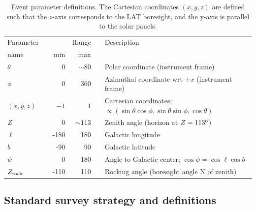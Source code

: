 \documentclass[aps,twocolumn,prd,superscriptaddress,showpacs,nofootinbib,fixfloat]{revtex4}
\newcommand{\degree}{^{\rm o}}
\newcommand{\zrock}{$Z_{\rm rock}$}
\begin{document}
\begin{table}
  \begin{center}
    \begin{tabular}{lcrrcl}
      \hline
      Parameter &\hphantom{i}& & Range &\hphantom{i}&  Description\\
      name      && min & max &&            \\
      \hline
      $\theta$ &&    0 &  $\sim80$ && Polar coordinate (instrument frame) \\
      $\phi$   &&    0 &       360 && Azimuthal coordinate wrt $+x$ (instrument frame) \\
      $(x,y,z)$&&  $-1$& $1$ && Cartesian coordinates;
      $\propto(\sin\theta\cos\phi, \sin\theta\sin\phi, \cos\theta)$\\
      $Z$      &&    0 & $\sim113$ && Zenith angle (horizon at $Z=113\degree$) \\
      $\ell$   && -180 & 180 && Galactic longitude \\
      $b$      &&  -90 &  90 && Galactic latitude \\
      $\psi$   &&    0 & 180 && Angle to Galactic center; $\cos\psi=\cos\ell\cos b$ \\
      \zrock\  && -110 & 110 && Rocking angle (boresight angle N of zenith) \\
      \hline
    \end{tabular}
    \caption{Event parameter definitions. The Cartesian coordinates $(x, y, z)$ are
    defined such that the $z$-axis corresponds to the LAT boresight, and the
    y-axis is parallel to the solar panels.}
    \label{tab:parameters}
  \end{center}
\end{table}

\subsection{Standard survey strategy and definitions}
\label{sec:conventions}





\end{document}
